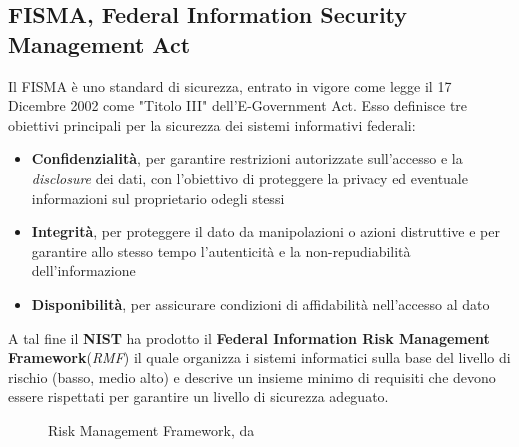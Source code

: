 \documentclass[../main.tex]{subfiles}
\begin{document}
\subsection{FISMA, Federal Information Security Management Act}
Il FISMA è uno standard di sicurezza, entrato in vigore come legge il 17 Dicembre 2002 come "Titolo III" dell'E-Government Act\cite{united2004information}.
Esso definisce tre obiettivi principali per la sicurezza dei sistemi informativi federali:
\begin{itemize}
    \item \textbf{Confidenzialità}, per garantire restrizioni autorizzate sull'accesso e la \textit{disclosure} dei dati, con l'obiettivo di proteggere la privacy ed eventuale informazioni sul proprietario odegli stessi
    \item \textbf{Integrità}, per proteggere il dato da manipolazioni o azioni distruttive e per garantire allo stesso tempo l'autenticità e la non-repudiabilità dell'informazione
    \item \textbf{Disponibilità}, per assicurare condizioni di affidabilità nell'accesso al dato
\end{itemize}

A tal fine il \textbf{NIST} ha prodotto il \textbf{Federal Information Risk Management Framework}(\textit{RMF}) il quale organizza i sistemi informatici sulla base del livello di rischio (basso, medio alto) e descrive un insieme minimo di requisiti che devono essere rispettati per garantire un livello di sicurezza adeguato\cite{nist2003nist}.

\begin{figure}[H]
\centering
{}
\caption{Risk Management Framework, da \cite{nist2003nist} }\label{fig:riskmanagementfw}
\end{figure}
\end{document}
